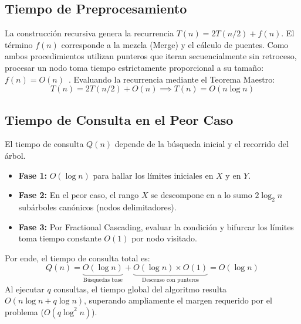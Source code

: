\documentclass[10pt,twocolumn,a4paper]{article}
\begin{document}
\subsection{Tiempo de Preprocesamiento}
La construcción recursiva genera la recurrencia $T(n) = 2T(n/2) + f(n)$. El término $f(n)$ corresponde a la mezcla (Merge) y el cálculo de puentes. Como ambos procedimientos utilizan punteros que iteran secuencialmente sin retroceso, procesar un nodo toma tiempo estrictamente proporcional a su tamaño: $f(n) = O(n)$~\cite{doc}. Evaluando la recurrencia mediante el Teorema Maestro:
\begin{equation}\label{eq:tiempo_build}
T(n) = 2T(n/2) + O(n) \implies T(n) = O(n \log n)
\end{equation}

\subsection{Tiempo de Consulta en el Peor Caso}
El tiempo de consulta $Q(n)$ depende de la búsqueda inicial y el recorrido del árbol. 
\begin{itemize}[leftmargin=*]
    \item \textbf{Fase 1:} $O(\log n)$ para hallar los límites iniciales en $X$ y en $Y$.
    \item \textbf{Fase 2:} En el peor caso, el rango $X$ se descompone en a lo sumo $2 \log_2 n$ subárboles canónicos (nodos delimitadores).
    \item \textbf{Fase 3:} Por Fractional Cascading, evaluar la condición y bifurcar los límites toma tiempo constante $O(1)$ por nodo visitado.
\end{itemize}
Por ende, el tiempo de consulta total es:
\begin{equation}
Q(n) = \underbrace{O(\log n)}_{\text{Búsquedas base}} + \underbrace{O(\log n) \times O(1)}_{\text{Descenso con punteros}} = O(\log n)
\end{equation}
Al ejecutar $q$ consultas, el tiempo global del algoritmo resulta $O(n \log n + q \log n)$, superando ampliamente el margen requerido por el problema ($O(q \log^2 n)$).
\end{document}
